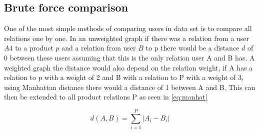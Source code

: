 \subsection{Brute force comparison}
One of the most simple methods of comparing users in data set is to compare all relations one by one. 
In an unweighted graph if there was a relation from a user $A4$ to a product $p$ and a relation from user $B$ to p there would be a distance $d$ of 0 between these users assuming that this is the only relation user A and B has. 
A weighted graph the distance would also depend on the relation weight, if A has a relation to p with a weight of 2 and B with a relation to P with a weight of 3, using Manhattan distance there would a distance of 1 between A and B. 
This can then be extended to all product relations P as seen in \autoref{eq:manhat}

\begin{equation}\label{eq:manhat}
	d(A,B) = \sum_{i=1}^{P} |A_i - B_i|
\end{equation}